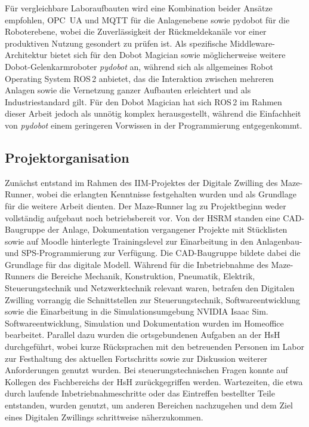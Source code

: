 Für vergleichbare Laboraufbauten wird eine Kombination beider Ansätze empfohlen, OPC~UA und MQTT für die Anlagenebene sowie pydobot für die Roboterebene, wobei die Zuverlässigkeit der Rückmeldekanäle vor einer produktiven Nutzung gesondert zu prüfen ist.
Als spezifische Middleware-Architektur bietet sich für den Dobot Magician sowie möglicherweise weitere Dobot-Gelenkarmroboter \emph{pydobot} an, während sich als allgemeines Robot Operating System ROS\,2 anbietet, das die Interaktion zwischen mehreren Anlagen sowie die Vernetzung ganzer Aufbauten erleichtert und als Industriestandard gilt.
Für den Dobot Magician hat sich ROS\,2 im Rahmen dieser Arbeit jedoch als unnötig komplex herausgestellt, während die Einfachheit von \emph{pydobot} einem geringeren Vorwissen in der Programmierung entgegenkommt.

\iffalse
\subsection{Projektorganisation}
Zunächst entstand im Rahmen des IIM-Projektes der Digitale Zwilling des Maze-Runner,
wobei die erlangten Kenntnisse festgehalten wurden und als Grundlage für die weitere Arbeit dienten.
Der Maze-Runner lag zu Projektbeginn weder vollständig aufgebaut noch betriebsbereit vor.
Von der HSRM standen eine CAD-Baugruppe der Anlage, Dokumentation
vergangener Projekte mit Stücklisten sowie auf Moodle hinterlegte Trainingslevel zur
Einarbeitung in den Anlagenbau- und SPS-Programmierung zur Verfügung.
Die CAD-Baugruppe bildete dabei die Grundlage für das digitale Modell.
Während für die Inbetriebnahme des Maze-Runners die Bereiche Mechanik, Konstruktion, Pneumatik, Elektrik, Steuerungstechnik und Netzwerktechnik relevant waren, betrafen den Digitalen Zwilling vorrangig die Schnittstellen zur Steuerungstechnik, Softwareentwicklung sowie die Einarbeitung in die Simulationsumgebung NVIDIA Isaac Sim.
Softwareentwicklung, Simulation und Dokumentation wurden im Homeoffice bearbeitet.
Parallel dazu wurden die ortsgebundenen Aufgaben an der HsH durchgeführt, wobei
kurze Rücksprachen mit den betreuenden Personen im Labor zur Festhaltung des
aktuellen Fortschritts sowie zur Diskussion weiterer Anforderungen genutzt wurden.
Bei steuerungstechnischen Fragen konnte auf Kollegen des Fachbereichs der HsH zurückgegriffen werden.
Wartezeiten, die etwa durch laufende Inbetriebnahmeschritte oder das Eintreffen
bestellter Teile entstanden, wurden genutzt, um anderen Bereichen nachzugehen und
dem Ziel eines Digitalen Zwillings schrittweise näherzukommen.


